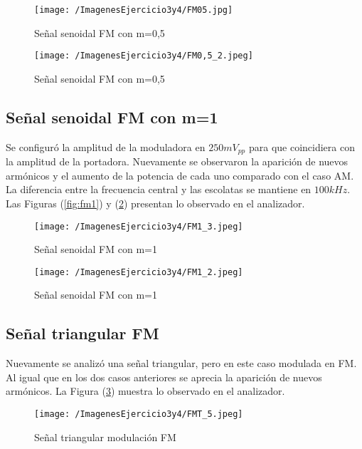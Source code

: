 \begin{figure}[H]
  \centering
  \begin{minipage}[b]{0.6\textwidth}
    \texttt{[image: /ImagenesEjercicio3y4/FM05.jpg]}
    \caption{Señal senoidal FM con m=0,5}
    \label{fig:fm05}
  \end{minipage}
  \hfill
  \begin{minipage}[b]{0.6\textwidth}
    \texttt{[image: /ImagenesEjercicio3y4/FM0,5\_2.jpeg]}
    \caption{Señal senoidal FM con m=0,5}
    \label{fig:fm055}
  \end{minipage}
\end{figure}

\subsection{Señal senoidal FM con m=1}
Se configuró la amplitud de la moduladora en $250 mV_{pp}$ para que coincidiera con la amplitud de la portadora. Nuevamente se observaron la aparición de nuevos armónicos y el aumento de la potencia de cada uno comparado con el caso AM. La diferencia entre la frecuencia central y las escolatas se mantiene en $100 kHz$. Las Figuras (\ref{fig:fm1}) y (\ref{fig:fm1_5}) presentan lo observado en el analizador.

\begin{figure}[H]
  \centering
  \begin{minipage}[b]{0.6\textwidth}
    \texttt{[image: /ImagenesEjercicio3y4/FM1\_3.jpeg]}
    \caption{Señal senoidal FM con m=1}
    \label{fig:fm1}
  \end{minipage}
  \hfill
  \begin{minipage}[b]{0.6\textwidth}
    \texttt{[image: /ImagenesEjercicio3y4/FM1\_2.jpeg]}
    \caption{Señal senoidal FM con m=1}
    \label{fig:fm1_5}
  \end{minipage}
\end{figure}

\subsection{Señal triangular FM}
Nuevamente se analizó una señal triangular, pero en este caso modulada en FM. Al igual que en los dos casos anteriores se aprecia la aparición de nuevos armónicos. La Figura (\ref{fig:fmt1}) muestra lo observado en el analizador.

\begin{figure}[H]
	\centering
	\texttt{[image: /ImagenesEjercicio3y4/FMT\_5.jpeg]}
\caption{Señal triangular modulación FM}
	\label{fig:fmt1}
\end{figure}\textbf{}

